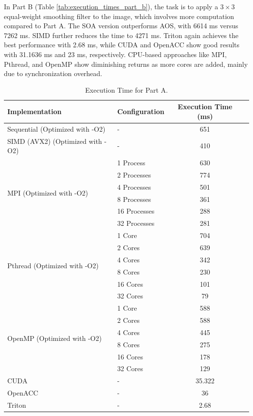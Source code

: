 \documentclass[12pt,a4paper]{report}
\begin{document}
In Part B (Table \ref{tab:execution_times_part_b}), the task is to apply a $3 \times 3$ equal-weight smoothing filter to the image, which involves more computation compared to Part A. The SOA version outperforms AOS, with 6614 ms versus 7262 ms. SIMD further reduces the time to 4271 ms. Triton again achieves the best performance with 2.68 ms, while CUDA and OpenACC show good results with 31.1636 ms and 23 ms, respectively. CPU-based approaches like MPI, Pthread, and OpenMP show diminishing returns as more cores are added, mainly due to synchronization overhead.



\begin{table}[htbp]
    \centering
    \footnotesize
    \renewcommand{\arraystretch}{0.8}%
    \begin{tabular}{llcc}
        \toprule
        \textbf{Implementation} & \textbf{Configuration} & \textbf{Execution Time (ms)} \\
        \midrule
        Sequential (Optimized with -O2) & - & 651 \\
        SIMD (AVX2) (Optimized with -O2) & - & 410 \\
        \midrule
        \multirow{6}{*}{MPI (Optimized with -O2)} & 1 Process & 630 \\
        & 2 Processes & 774 \\
        & 4 Processes & 501 \\
        & 8 Processes & 361 \\
        & 16 Processes & 288 \\
        & 32 Processes & 281 \\
        \midrule
        \multirow{6}{*}{Pthread (Optimized with -O2)} & 1 Core & 704 \\
        & 2 Cores & 639 \\
        & 4 Cores & 342 \\
        & 8 Cores & 230 \\
        & 16 Cores & 101 \\
        & 32 Cores & 79 \\
        \midrule
        \multirow{6}{*}{OpenMP (Optimized with -O2)} & 1 Core & 588 \\
        & 2 Cores & 588 \\
        & 4 Cores & 445 \\
        & 8 Cores & 275 \\
        & 16 Cores & 178 \\
        & 32 Cores & 129 \\
        \midrule
        CUDA & - & 35.322 \\
        OpenACC & - & 36 \\
        Triton & - & 2.68 \\
        \bottomrule
    \end{tabular}%
    \caption{Execution Time for Part A.}
    \label{tab:execution_times_part_a}
\end{table}
\end{document}
